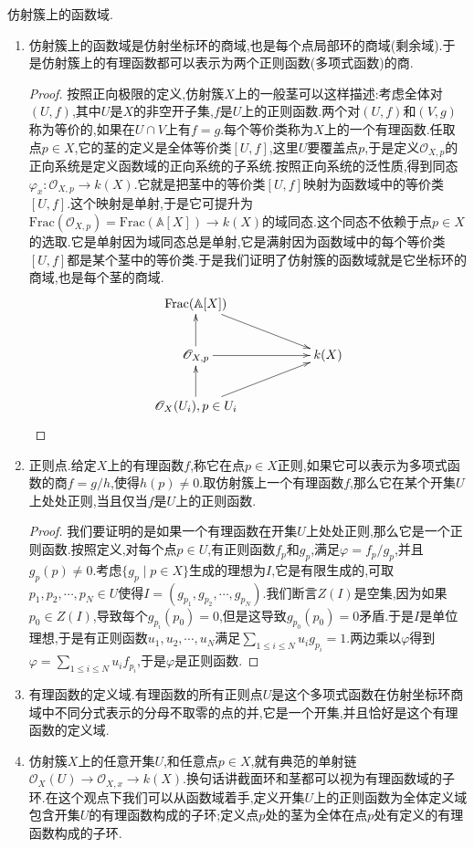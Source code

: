 仿射簇上的函数域.
\begin{enumerate}
	\item 仿射簇上的函数域是仿射坐标环的商域,也是每个点局部环的商域(剩余域).于是仿射簇上的有理函数都可以表示为两个正则函数(多项式函数)的商.
	\begin{proof}
	
	    按照正向极限的定义,仿射簇$X$上的一般茎可以这样描述:考虑全体对$(U,f)$,其中$U$是$X$的非空开子集,$f$是$U$上的正则函数.两个对$(U,f)$和$(V,g)$称为等价的,如果在$U\cap V$上有$f=g$.每个等价类称为$X$上的一个有理函数.任取点$p\in X$,它的茎的定义是全体等价类$[U,f]$,这里$U$要覆盖点$p$,于是定义$\mathscr{O}_{X,p}$的正向系统是定义函数域的正向系统的子系统.按照正向系统的泛性质,得到同态$\varphi_x:\mathscr{O}_{X,p}\to k(X)$.它就是把茎中的等价类$[U,f]$映射为函数域中的等价类$[U,f]$.这个映射是单射,于是它可提升为$\mathrm{Frac}(\mathscr{O}_{X,p})=\mathrm{Frac}(\mathbb{A}[X])\to k(X)$的域同态.这个同态不依赖于点$p\in X$的选取.它是单射因为域同态总是单射,它是满射因为函数域中的每个等价类$[U,f]$都是某个茎中的等价类.于是我们证明了仿射簇的函数域就是它坐标环的商域,也是每个茎的商域.
	    $$\xymatrix{\mathrm{Frac}(\mathbb{A}[X])\ar[drr]&&\\\mathscr{O}_{X,p}\ar[rr]\ar[u]&&k(X)\\\mathscr{O}_X(U_i),p\in U_i\ar[u]\ar[urr]&&}$$
	\end{proof}
    \item 正则点.给定$X$上的有理函数$f$,称它在点$p\in X$正则,如果它可以表示为多项式函数的商$f=g/h$,使得$h(p)\not=0$.取仿射簇上一个有理函数$f$,那么它在某个开集$U$上处处正则,当且仅当$f$是$U$上的正则函数.
    \begin{proof}
    	
    	我们要证明的是如果一个有理函数在开集$U$上处处正则,那么它是一个正则函数.按照定义,对每个点$p\in U$,有正则函数$f_p$和$g_p$,满足$\varphi=f_p/g_p$,并且$g_p(p)\not=0$.考虑$\{g_p\mid p\in X\}$生成的理想为$I$,它是有限生成的,可取$p_1,p_2,\cdots,p_N\in U$使得$I=(g_{p_1},g_{p_2},\cdots,g_{p_N})$.我们断言$Z(I)$是空集,因为如果$p_0\in Z(I)$,导致每个$g_{p_i}(p_0)=0$,但是这导致$g_{p_0}(p_0)=0$矛盾.于是$I$是单位理想,于是有正则函数$u_1,u_2,\cdots,u_N$满足$\sum_{1\le i\le N}u_ig_{p_i}=1$.两边乘以$\varphi$得到$\varphi=\sum_{1\le i\le N}u_if_{p_i}$,于是$\varphi$是正则函数.
    \end{proof}
    \item 有理函数的定义域.有理函数的所有正则点$U$是这个多项式函数在仿射坐标环商域中不同分式表示的分母不取零的点的并,它是一个开集,并且恰好是这个有理函数的定义域.
	\item 仿射簇$X$上的任意开集$U$,和任意点$p\in X$,就有典范的单射链$\mathscr{O}_X(U)\to\mathscr{O}_{X,x}\to k(X)$.换句话讲截面环和茎都可以视为有理函数域的子环.在这个观点下我们可以从函数域着手,定义开集$U$上的正则函数为全体定义域包含开集$U$的有理函数构成的子环;定义点$p$处的茎为全体在点$p$处有定义的有理函数构成的子环.
\end{enumerate}


